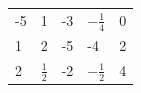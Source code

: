 \documentclass{standalone}
\begin{document}
\begin{tabularx}{5in}{ |*{5}{Y|} }
  \hline
   &  &  &  &  \\
   & 1 & -3 & $\textstyle -\frac{1}{4}$ & 0 \\
   & 2 & -5 & -4 & 2 \\
   & $\textstyle \frac{1}{2}$ & -2 & $\textstyle -\frac{1}{2}$ & 4 \\
  \hline
\end{tabularx}
\end{document}
